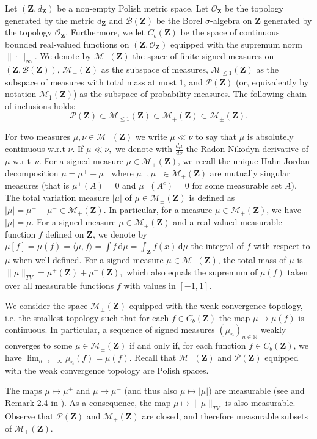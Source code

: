 \documentclass[12pt,twoside,a4paper]{article}
\def\N{\mathbb{N}}
\newcommand{\Space}{\mathbf{Z}}
\newcommand{\Topo}{\mathcal{O}_\Space}
\newcommand{\Borel}{\mathcal{B}(\Space)}
\newcommand{\Proba}{\mathcal{P}(\Space)}
\newcommand{\Probam}{\mathcal{M}_1(\Space)}
\newcommand{\SubProba}{\mathcal{M}_{\leq1}(\Space)}
\newcommand{\Meas}{\mathcal{M}_+(\Space)}
\newcommand{\SignedMeas}{\mathcal{M}_{\pm}(\Space)}
\newcommand{\CbFunct}{C_b(\Space)}
\newcommand{\rd}{\mathrm{d}}
\begin{document}
Let $(\Space,d_{\Space})$ be a non-empty Polish metric space. Let $\Topo$ be the topology generated by the metric $d_{\Space}$ and $\Borel$ be the Borel $\sigma$-algebra on $\Space$ generated by the topology $\Topo$. Furthermore, we let $\CbFunct$ be the  space of continuous bounded real-valued functions on $(\Space,\Topo)$ equipped with the supremum norm $\|\cdot\|_{\infty}.$ We denote by $\SignedMeas$ the space of finite signed measures on $(\Space,\Borel)$, $\Meas$ as the subspace of measures, $\SubProba$ as the subspace of measures with total mass at most $1$, and $\Proba$ (or, equivalently by notation $\Probam$) as the subspace of probability measures. The following chain of inclusions holds:
\[
  \Proba \subset \SubProba \subset \Meas \subset \SignedMeas .
\]

For two measures $\mu,\nu\in  \Meas$ we write $\mu \ll\nu$ to say that $\mu$ is absolutely continuous w.r.t $\nu.$ If $\mu\ll\nu,$ we denote with $\frac{d\mu}{d\nu}$ the Radon-Nikodyn derivative of $\mu$ w.r.t\ $\nu.$ For a signed measure $\mu\in\SignedMeas$, we recall the unique Hahn-Jordan decomposition $\mu  = \mu^+ -  \mu^-$ where $\mu^+, \mu^-  \in\Meas$ are mutually singular measures (that  is $\mu^+(A)=0$ and $\mu^-(A^c)=0$ for some measurable set $A$).
The total variation measure $\vert\mu\vert$ of $\mu\in\SignedMeas$ is defined as $\vert\mu\vert  =   \mu^+  +  \mu^-  \in  \Meas$. In particular, for a measure $\mu\in\Meas$, we have $\vert  \mu \vert  = \mu$. For a signed measure $\mu\in \SignedMeas$ and a real-valued measurable function $f$ defined on $\Space$, we denote by $\mu[f]=\mu(f)=\langle \mu, f \rangle=
\int f \, \rd \mu=\int_{\Space} f(x)\, \rd\mu$ the integral of $f$ with respect to $\mu$ when well defined. For a signed measure  $\mu\in\SignedMeas$, the total mass of $\mu$ is $\|{\mu}\|_{TV}=\mu^+(\Space) + \mu^-(\Space),$ which also equals the supremum of $\mu(f)$ taken over all measurable functions $f$ with values in $[-1,1]$.

We consider the space $\SignedMeas$ equipped with the weak convergence topology, i.e. the smallest topology such that for each $f\in\CbFunct$ the map $\mu \mapsto \mu(f)$ is continuous. In particular, a sequence  of signed measures $(\mu_n)_{n\in\N}$  weakly converges to some $\mu\in\SignedMeas$ if and only if, for each function $f\in   \CbFunct$, we have $\lim_{n\to +\infty} \mu_n(f) = \mu(f)$. Recall that $\Meas$ and $\Proba$ equipped with the weak convergence topology are Polish spaces. 

The maps $\mu   \mapsto  \mu^+$ and $\mu   \mapsto  \mu^-$ (and thus also $\mu \mapsto \vert\mu\vert$) are measurable (see \cite[Theorem~2.8]{MeasurableSetsMeasures} and Remark 2.4 in \cite{abraham2023probabilitygraphons}). As a consequence, the map $\mu \mapsto \|\mu\|_{TV}$ is also measurable.
Observe that $\Proba$ and $\Meas$ are closed, and therefore measurable subsets of $\SignedMeas.$
\end{document}
